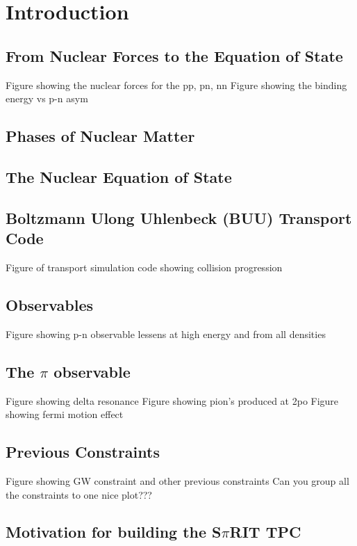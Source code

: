 \chapter{Introduction}

\section{From Nuclear Forces to the Equation of State}
Figure showing the nuclear forces for the pp, pn, nn 
Figure showing the binding energy vs p-n asym

\section{Phases of Nuclear Matter}

\section{The Nuclear Equation of State}

\section{Boltzmann Ulong Uhlenbeck (BUU) Transport Code}
Figure of transport simulation code showing collision progression 

\section{Observables}
Figure showing p-n observable lessens at high energy and from all densities 

\section{The $\pi$ observable}
Figure showing delta resonance 
Figure showing pion's produced at 2po 
Figure showing fermi motion effect

\section{Previous Constraints}
Figure showing GW constraint and other previous constraints 
Can you group all the constraints to one nice plot???

\section{Motivation for building the S$\pi$RIT TPC}

